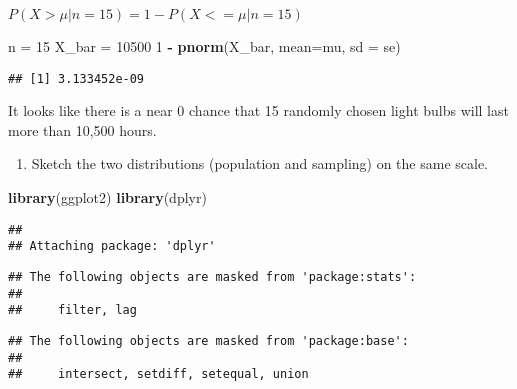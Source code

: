 \documentclass[
]{article}
\newenvironment{Shaded}{\begin{snugshade}}{\end{snugshade}}
\newcommand{\DataTypeTok}[1]{\textcolor[rgb]{0.13,0.29,0.53}{#1}}
\newcommand{\DecValTok}[1]{\textcolor[rgb]{0.00,0.00,0.81}{#1}}
\newcommand{\KeywordTok}[1]{\textcolor[rgb]{0.13,0.29,0.53}{\textbf{#1}}}
\newcommand{\NormalTok}[1]{#1}
\newcommand{\OperatorTok}[1]{\textcolor[rgb]{0.81,0.36,0.00}{\textbf{#1}}}
\newcommand{\StringTok}[1]{\textcolor[rgb]{0.31,0.60,0.02}{#1}}
\providecommand{\tightlist}{%
  \setlength{\itemsep}{0pt}\setlength{\parskip}{0pt}}
\begin{document}
\(P(X > \mu | n=15) = 1 - P(X <= \mu | n=15)\)

\begin{Shaded}
\begin{Highlighting}[]
\NormalTok{n =}\StringTok{ }\DecValTok{15}
\NormalTok{X_bar =}\StringTok{ }\DecValTok{10500}
\DecValTok{1} \OperatorTok{-}\StringTok{ }\KeywordTok{pnorm}\NormalTok{(X_bar, }\DataTypeTok{mean=}\NormalTok{mu, }\DataTypeTok{sd =}\NormalTok{ se)}
\end{Highlighting}
\end{Shaded}

\begin{verbatim}
## [1] 3.133452e-09
\end{verbatim}

It looks like there is a near 0 chance that 15 randomly chosen light
bulbs will last more than 10,500 hours.

\begin{enumerate}
\def\labelenumi{(\alph{enumi})}
\setcounter{enumi}{3}
\tightlist
\item
  Sketch the two distributions (population and sampling) on the same
  scale.
\end{enumerate}

\begin{Shaded}
\begin{Highlighting}[]
\KeywordTok{library}\NormalTok{(ggplot2)}
\KeywordTok{library}\NormalTok{(dplyr)}
\end{Highlighting}
\end{Shaded}

\begin{verbatim}
## 
## Attaching package: 'dplyr'
\end{verbatim}

\begin{verbatim}
## The following objects are masked from 'package:stats':
## 
##     filter, lag
\end{verbatim}

\begin{verbatim}
## The following objects are masked from 'package:base':
## 
##     intersect, setdiff, setequal, union
\end{verbatim}
\end{document}

